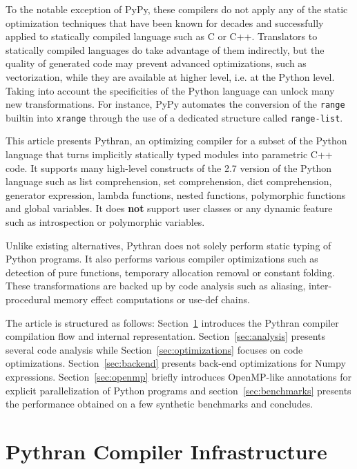 \documentclass[10pt, onecolumn, preprint]{sigplanconf}
\begin{document}
To the notable exception of PyPy, these compilers do not apply any of the
static optimization techniques that have been known for decades and
successfully applied to statically compiled language such as C or C++.
Translators to statically compiled languages do take advantage of them
indirectly, but the quality of generated code may prevent advanced
optimizations, such as vectorization, while they are available at higher level,
i.e. at the Python level. Taking into account the specificities of the Python
language can unlock many new transformations. For instance, PyPy automates the
conversion of the \texttt{range} builtin into \texttt{xrange} through the use
of a dedicated structure called \texttt{range-list}.

This article presents Pythran, an optimizing compiler for a subset of the
Python language that turns implicitly statically typed modules into parametric
C++ code. It supports many high-level constructs of the 2.7 version of the
Python language such as list comprehension, set comprehension, dict
comprehension, generator expression, lambda functions, nested functions,
polymorphic functions and global variables. It does \textbf{not} support user
classes or any dynamic feature such as introspection or polymorphic variables.

Unlike existing alternatives, Pythran does not solely perform static typing of
Python programs. It also performs various compiler optimizations such as
detection of pure functions, temporary allocation removal or constant folding.
These transformations are backed up by code analysis such as aliasing,
inter-procedural memory effect computations or use-def chains.

The article is structured as follows: Section~\ref{sec:infrastructure}
introduces the Pythran compiler compilation flow and internal representation.
Section~\ref{sec:analysis} presents several code analysis while
Section~\ref{sec:optimizations} focuses on code optimizations.
Section~\ref{sec:backend} presents back-end optimizations for Numpy
expressions. Section~\ref{sec:openmp}  briefly introduces OpenMP-like
annotations for explicit parallelization of Python programs and
section~\ref{sec:benchmarks} presents the performance obtained on a few
synthetic benchmarks and concludes.


\section{Pythran Compiler Infrastructure}
\label{sec:infrastructure}
\end{document}
